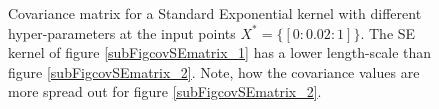 \begin{figure}[!ht]
  \centering
    \quad
{}\quad
  
       \caption{Covariance matrix for a Standard Exponential kernel with different hyper-parameters at the input points $X^{*} = \{[0:0.02:1]\}$. The SE kernel of figure \ref{subFigcovSEmatrix_1} has a lower length-scale than figure \ref{subFigcovSEmatrix_2}. Note, how the covariance values are more spread out for figure \ref{subFigcovSEmatrix_2}.}\label{figGPCovarianceMatrix}
\end{figure}

